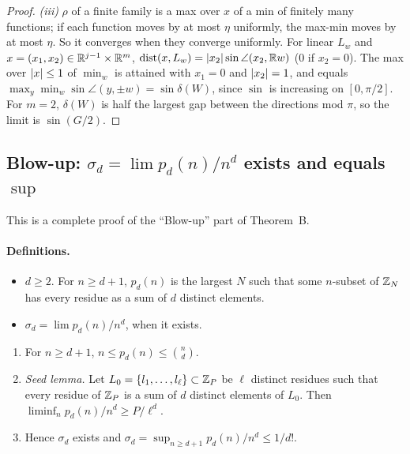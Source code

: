 \begin{proof}
\emph{(iii)} $\rho$ of a finite family is a max over $x$ of a min of finitely many functions; if
each function moves by at most $\eta$ uniformly, the max-min moves by at most $\eta$. So it
converges when they converge uniformly. For linear $L_w$ and
$x = (x_1, x_2) \in \mathbb{R}^{j-1} \times \mathbb{R}^m$, $\operatorname{dist}(x, L_w) = \left|x_2\right| \sin \angle(x_2, \mathbb{R} w)$
($0$ if $x_2 = 0$). The max over $\left|x\right| \le 1$ of $\min_w$ is attained with $x_1 = 0$ and
$\left|x_2\right| = 1$, and equals $\max_y \min_w \sin \angle(y, \pm w) = \sin \delta(W)$, since $\sin$ is
increasing on $[0, \pi/2]$. For $m = 2$, $\delta(W)$ is half the largest gap between the
directions mod $\pi$, so the limit is $\sin(G/2)$.
\end{proof}

\subsection{\texorpdfstring{Blow-up: $\sigma_d = \lim p_d(n)/n^d$ exists and equals $\sup$}{Blow-up: sigma\_d = lim p\_d(n)/n\^{}d exists and equals sup}}\label{sec:B-blowup}

This is a complete proof of the ``Blow-up'' part of Theorem~B.

\paragraph{Definitions.}
\begin{itemize}
  \item $d \ge 2$. For $n \ge d+1$, $p_d(n)$ is the largest $N$ such that some $n$-subset of
    $\mathbb{Z}_N$ has every residue as a sum of $d$ distinct elements.
  \item $\sigma_d = \lim p_d(n)/n^d$, when it exists.
\end{itemize}

\begin{proposition}\label{prop:B-blowup}
\leavevmode
\begin{enumerate}[label=(\alph*)]
  \item For $n \ge d+1$, $n \le p_d(n) \le \binom{n}{d}$.
  \item \emph{Seed lemma.} Let $L_0 = \{l_1, \dots, l_\ell\} \subset \mathbb{Z}_P$ be $\ell$ distinct
    residues such that every residue of $\mathbb{Z}_P$ is a sum of $d$ distinct elements of $L_0$. Then
    $\liminf_n p_d(n)/n^d \ge P/\ell^d$.
  \item Hence $\sigma_d$ exists and $\sigma_d = \sup_{n \ge d+1} p_d(n)/n^d \le 1/d!$.
\end{enumerate}
\end{proposition}


